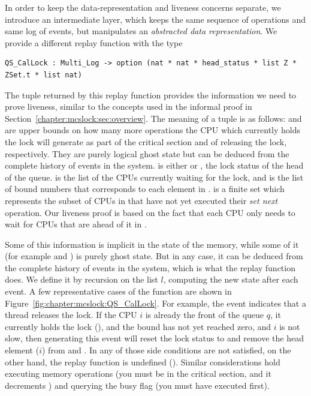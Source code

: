 In order to keep the data-representation and liveness concerns separate,
we introduce an intermediate layer, which keeps the same sequence of operations and same log of events, 
but manipulates an \emph{abstracted data representation}.
We provide a different replay function with the type 

\begin{lstlisting}
QS_CalLock : Multi_Log -> option (nat * nat * head_status * list Z * ZSet.t * list nat)
\end{lstlisting}

The tuple returned by this replay function provides the information we
need to prove liveness, 
similar to the concepts used in the informal
proof in Section~\ref{chapter:mcslock:sec:overview}. 
The meaning of a tuple  is as follows:  and  are upper bounds on how many more operations 
the CPU which currently holds the lock will generate as part of the critical section and of 
releasing the lock, respectively. 
They are purely logical ghost state but can be deduced from the complete
history of events in the system.
 is either   or , 
the lock status of the head of the queue.
 is the list of the CPUs currently waiting for the lock, 
and  is the list of bound numbers that 
corresponds to each element in .
 is a finite set which represents the subset of CPUs in  that have not yet executed their \emph{set next} operation.  
Our liveness proof is based on the fact that each CPU only needs to wait for CPUs that are ahead of it in .

Some of this information is implicit in the state of the memory, while some of it (for example  and ) is purely ghost state. But in any case, it can be deduced from the complete history of events in the system, which is what the replay function  does. We define it by recursion on the list $l$, computing the new state after each event. A few representative cases of the function are shown in Figure~\ref{fig:chapter:mcslock:QS_CalLock}.  For example, the event
 indicates that a thread releases the lock. If the CPU $i$ is already the  front of the queue $q$, it currently holds the lock (), and the bound  has not yet reached zero, and $i$ is not slow, then generating this event will reset the lock status to  and remove the head element ($i$) from  and . In any of those side conditions are not satisfied, on the other hand, the replay function is undefined (). Similar
considerations hold executing memory operations (you must be in the critical section, and it decrements ) and querying the busy flag (you must have executed  first).

